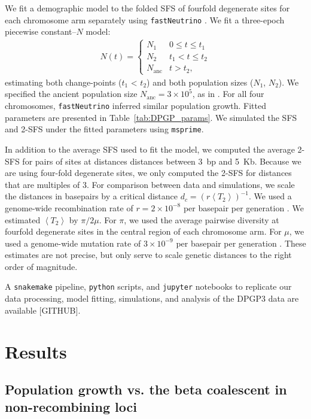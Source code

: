 \documentclass[11pt, letterpaper]{article}   	%
\newcommand{\E}[1]{\left< #1 \right>}
\begin{document}
We fit a demographic model to the folded SFS of fourfold degenerate sites for each chromosome arm separately using \texttt{fastNeutrino} \autocite{BhaskarEtAl2015}.
We fit a three-epoch piecewise constant--$N$ model:
\begin{align}
    N(t) = \begin{cases}
                N_1 & 0 \leq t \leq t_1 \\
                N_2 & t_1 <  t \leq t_2 \\
                N_{\text{anc}} & t > t_2,
            \end{cases}
    \label{eq:piecewise}
\end{align}
estimating both change-points ($t_1$ < $t_2$) and both population sizes ($N_1$, $N_2$).
We specified the ancient population size $N_{\text{anc}} = 3\times 10^5$, as in \cite{RagsdaleGutenkunst2017}.
For all four chromosomes, \texttt{fastNeutrino} inferred similar population growth.
Fitted parameters are presented in Table~\ref{tab:DPGP_params}.
We simulated the SFS and 2-SFS under the fitted parameters using \texttt{msprime}.

In addition to the average SFS used to fit the model, we computed the average 2-SFS for pairs of sites at distances distances between 3~bp and 5~Kb.
Because we are using four-fold degenerate sites, we only computed the 2-SFS for distances that are multiples of 3.
For comparison between data and simulations, we scale the distances in basepairs by a critical distance $d_c = (r\E{T_2})^{-1}$.
We used a genome-wide recombination rate of $r = 2 \times 10^{-8}$ per basepair per generation \autocite{ComeronEtAl2012}.
We estimated $\E{T_2}$ by $\pi / 2 \mu$.
For $\pi$, we used the average pairwise diversity at fourfold degenerate sites in the central region of each chromosome arm.
For $\mu$, we used a genome-wide mutation rate of $3 \times 10^{-9}$ per basepair per generation \autocite{KeightlyEtAl2014}.
These estimates are not precise, but only serve to scale genetic distances to the right order of magnitude.

A \texttt{snakemake} pipeline, \texttt{python} scripts, and \texttt{jupyter} notebooks to replicate our data processing, model fitting, simulations, and analysis of the DPGP3 data are available [GITHUB].

\section*{Results \label{sec:results}}

\subsection*{Population growth vs. the beta coalescent in non-recombining loci}
\end{document}
